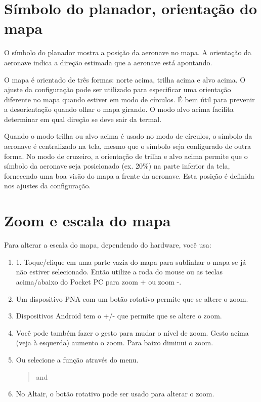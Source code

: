 \section{Símbolo do planador, orientação do mapa}
O símbolo do planador mostra a posição da aeronave no mapa.  A orientação da aeronave indica a direção estimada que a aeronave está apontando.

O mapa é orientado de três formas: norte acima, trilha acima e alvo acima.  O ajuste da configuração pode ser utilizado para especificar uma orientação diferente no mapa quando estiver em modo de círculos.  É bem útil para prevenir a desorientação quando olhar o mapa girando.  O modo alvo acima facilita determinar em qual direção se deve sair da termal.

Quando o modo trilha ou alvo acima é usado no modo de círculos, o símbolo da aeronave é centralizado na tela, mesmo que o símbolo seja configurado de outra forma.  No modo de cruzeiro, a orientação de trilha e alvo acima permite que o símbolo da aeronave seja posicionado (ex. 20\%) na parte inferior da tela, fornecendo uma boa visão do mapa a frente da aeronave.  Esta posição é definida nos ajustes da configuração.  

\section{Zoom e escala do mapa}\label{sec:zooming}

Para alterar a escala do mapa, dependendo do hardware, você usa:
\begin{enumerate}
\item 1.	Toque/clique em uma parte vazia do mapa para sublinhar o mapa se já não estiver selecionado.  Então utilize a roda do mouse ou as teclas acima/abaixo do Pocket PC para zoom + ou zoom -.
\item Um dispositivo PNA com um botão rotativo permite que se altere o zoom.
\item Dispositivos Android tem o +/- que permite que se altere o zoom.
\item Você pode também fazer o gesto para mudar o nível de zoom. Gesto acima (veja à esquerda) aumento o zoom.  Para baixo diminui o zoom.
\item Ou selecione a função através do menu.
\begin{quote}
\blink{} and 
\end{quote}
\item No Altair, o botão rotativo pode ser usado para alterar o zoom.
\end{enumerate}

